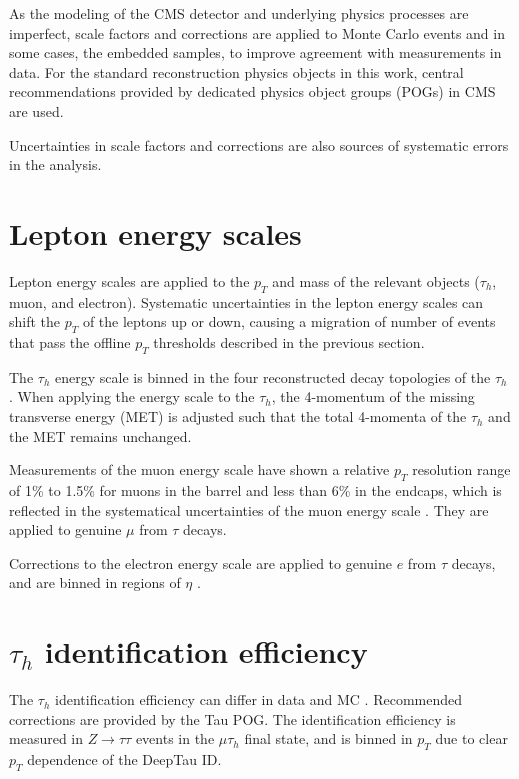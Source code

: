 As the modeling of the CMS detector and underlying physics processes are imperfect, scale factors and corrections are applied to Monte Carlo events and in some cases, the embedded samples, to improve agreement with measurements in data. For the standard reconstruction physics objects in this work, central recommendations provided by dedicated physics object groups (POGs) in CMS are used.

Uncertainties in scale factors and corrections are also sources of systematic errors in the analysis.


\section{Lepton energy scales}

Lepton energy scales are applied to the $p_{T}$ and mass of the relevant objects ($\tau_{h}$, muon, and electron). Systematic uncertainties in the lepton energy scales can shift the $p_{T}$ of the leptons up or down, causing a migration of number of events that pass the offline $p_{T}$ thresholds described in the previous section.

The $\tau_{h}$ energy scale is binned in the four reconstructed decay topologies of the $\tau_{h}$ \cite{twiki_TAU_POG_tauidrecommendationforrun2}. When applying the energy scale to the $\tau_{h}$, the 4-momentum of the missing transverse energy (MET) is adjusted such that the total 4-momenta of the $\tau_{h}$ and the MET remains unchanged. 

Measurements of the muon energy scale have shown a relative $p_{T}$ resolution range of 1\% to 1.5\% for muons in the barrel and less than 6\% in the endcaps, which is reflected in the systematical uncertainties of the muon energy scale \cite{twiki_MUON_POG_recommendation}. They are applied to genuine $\mu$ from $\tau$ decays.

Corrections to the electron energy scale are applied to genuine $e$ from $\tau$ decays, and are binned in regions of $\eta$ \cite{twiki_Electron_POG_recommendation}.

\section{$\tau_{h}$ identification efficiency}
The $\tau_{h}$ identification efficiency can differ in data and MC \cite{twiki_TAU_POG_tauidrecommendationforrun2}. Recommended corrections are provided by the Tau POG. The identification efficiency is measured in $Z \rightarrow \tau\tau$ events in the $\mu\tau_{h}$ final state, and is binned in $p_{T}$ due to clear $p_{T}$ dependence of the DeepTau ID. 

